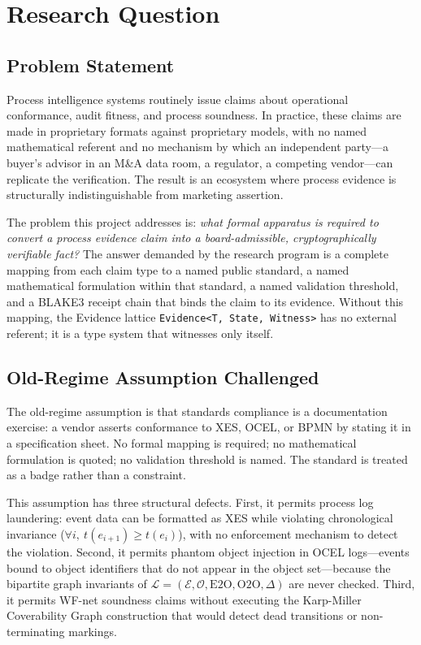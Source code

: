 
\section{Research Question}
\label{sec:standards-rq}

\subsection{Problem Statement}
\label{sec:standards-rq-problem}

Process intelligence systems routinely issue claims about operational conformance, audit
fitness, and process soundness. In practice, these claims are made in proprietary formats
against proprietary models, with no named mathematical referent and no mechanism by which
an independent party---a buyer's advisor in an M\&A data room, a regulator, a competing
vendor---can replicate the verification. The result is an ecosystem where process evidence
is structurally indistinguishable from marketing assertion.

The problem this project addresses is: \emph{what formal apparatus is required to convert
a process evidence claim into a board-admissible, cryptographically verifiable fact?} The
answer demanded by the research program is a complete mapping from each claim type to a
named public standard, a named mathematical formulation within that standard, a named
validation threshold, and a BLAKE3 receipt chain that binds the claim to its evidence.
Without this mapping, the Evidence lattice \texttt{Evidence<T, State, Witness>} has no
external referent; it is a type system that witnesses only itself.

\subsection{Old-Regime Assumption Challenged}
\label{sec:standards-rq-old-regime}

The old-regime assumption is that standards compliance is a documentation exercise: a
vendor asserts conformance to XES, OCEL, or BPMN by stating it in a specification sheet.
No formal mapping is required; no mathematical formulation is quoted; no validation
threshold is named. The standard is treated as a badge rather than a constraint.

This assumption has three structural defects. First, it permits process log laundering:
event data can be formatted as XES while violating chronological invariance
($\forall i,\ t(e_{i+1}) \ge t(e_i)$), with no enforcement mechanism to detect the
violation. Second, it permits phantom object injection in OCEL logs---events bound to
object identifiers that do not appear in the object set---because the bipartite graph
invariants of $\mathcal{L}=(\mathcal{E}, \mathcal{O}, \text{E2O}, \text{O2O}, \Delta)$
are never checked. Third, it permits WF-net soundness claims without executing the
Karp-Miller Coverability Graph construction that would detect dead transitions or
non-terminating markings.

